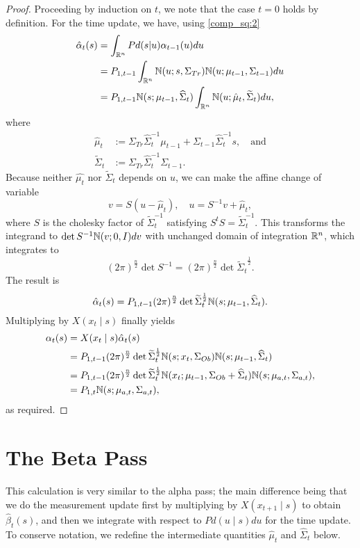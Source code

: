 \documentclass[12pt,leqno]{article}
\begin{document}
\begin{proof}

Proceeding by induction on $t$, we note that the case $t = 0$ holds by definition.
For the time update, we have, using \eqref{comp_sq:2}
\begin{align}
  \hat{\alpha}_t(s) &= \int_{{\mathbb R}^n}Pd(s|u)\alpha_{t-1}(u)du \\\notag
  &= P_{1,t-1}\int_{{\mathbb R}^n}{\mathbb N}(u;s,\Sigma_{Tr}){\mathbb N}(u;\mu_{t-1},\Sigma_{t-1})du \notag\\
  &= P_{1,t-1}{\mathbb N}(s;\mu_{t-1},\widehat{\Sigma}_t)\int_{{\mathbb R}^n}{\mathbb N}(u;\hat{\mu}_t,
  \widetilde{\Sigma}_t) du,
\end{align}
where
 \begin{align*}
  \hat{\mu}_t &:= \Sigma_{Tr}\widehat{\Sigma}_t^{-1}\mu_{t-1} +
  \Sigma_{t-1}\widehat{\Sigma}_t^{-1}s, \quad\text{and}\\
  \widetilde{\Sigma}_t &:= \Sigma_{Tr}\widehat{\Sigma}_t^{-1}\Sigma_{t-1}.
  \end{align*}
Because neither $\hat{\mu_t}$ nor $\widetilde{\Sigma}_t$ depends on $u$, we can
make the affine change of variable
$$
v = S(u-\hat{\mu}_t),\quad u = S^{-1}v+\hat{\mu}_t,
$$
where $S$ is the cholesky factor of $\widetilde{\Sigma}_t^{-1}$ satisfying
$S^tS = \widetilde{\Sigma}_t^{-1}$. This transforms the integrand to
  $\det{S}^{-1}{\mathbb N}(v;0,I)dv$
with unchanged domain of integration ${\mathbb R}^n$, which integrates to
$$
(2\pi)^{\frac{n}{2}}\det{S}^{-1} = (2\pi)^{\frac{n}{2}}\det{\widetilde{\Sigma}_t}^{\frac{1}{2}}.
$$
The result is
$$
\hat{\alpha}_t(s) = P_{1,t-1}(2\pi)^{\frac{n}{2}}\det{\widetilde{\Sigma}_t}^{\frac{1}{2}}
{\mathbb N}(s;\mu_{t-1},\widehat{\Sigma}_t).
$$
Multiplying by $X(x_t\mid s)$ finally yields
\begin{align*}
  \alpha_t(s) &= X(x_t\mid s)\hat{\alpha}_t(s) \\
  &= P_{1,t-1}(2\pi)^{\frac{n}{2}}\det{\widetilde{\Sigma}_t}^{\frac{1}{2}}
  {\mathbb N}(s;x_t,\Sigma_{Ob}){\mathbb N}(s;\mu_{t-1},\widehat{\Sigma}_t) \\
  &= P_{1,t-1}(2\pi)^{\frac{n}{2}}\det{\widetilde{\Sigma}_t}^{\frac{1}{2}}
  {\mathbb N}(x_t;\mu_{t-1},\Sigma_{Ob} + \widehat{\Sigma}_t){\mathbb N}(s;\mu_{a,t},\Sigma_{a,t}), \\
  &= P_{1,t}{\mathbb N}(s;\mu_{a,t},\Sigma_{a,t}),
\end{align*}
as required.
\end{proof}

\section{The Beta Pass}
This calculation is very similar to the alpha pass; the main difference being that we do
the measurement update first by multiplying by $X(x_{t+1}\mid s)$ to obtain $\hat{\beta}_t(s)$,
and then we integrate with respect to $Pd(u\mid s)du$ for the time update.  To conserve notation,
we redefine the intermediate quantities $\hat{\mu}_t$ and $\widehat{\Sigma}_t$ below.
\end{document}
